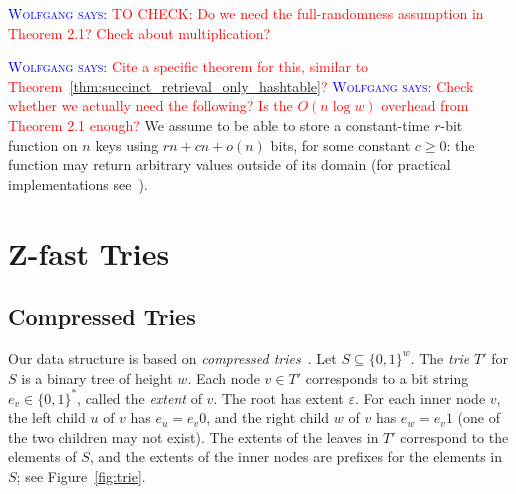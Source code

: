 \documentclass[a4paper,11pt]{article}
\newcommand{\eps}{\varepsilon}
\newcommand{\?}{\mskip1.5mu}
\newcommand{\aremark}[3]{\textcolor{blue}{\textsc{#1 #2:}}
  \textcolor{red}{\textsf{#3}}}
\newcommand{\wolfgang}[2][says]{\aremark{Wolfgang}{#1}{#2}}
\begin{document}
\wolfgang{TO CHECK: Do we need the full-randomness assumption in 
Theorem 2.1? Check about multiplication?}

\wolfgang{Cite a specific theorem for this, similar to 
  Theorem~\ref{thm:succinct_retrieval_only_hashtable}?}
\wolfgang{Check whether we actually need the following? Is the
$O(n \log w)$ overhead from Theorem 2.1 enough?}
We assume to be able to store a constant-time $r$-bit function on 
$n$ keys using $rn+cn +o(n)$ bits, for some constant $c\geq 0$: the 
function may return arbitrary values outside of its domain (for 
practical implementations see~\cite{BelazzouguiBoPaVi11}).

\section{Z-fast Tries} 

\subsection{Compressed Tries}
Our data structure is based on \emph{compressed
tries}~\cite{CormenLeRiSt09,Knuth98}. 
Let $S \subseteq \{0, 1\}^w$. The \emph{trie} $T'$ for $S$ 
is a binary tree of height $w$. Each node $v \in T'$ corresponds
to a bit string $e_v \in \{0,1\}^*$, called the \emph{extent} of $v$. 
The root has extent $\eps$. For each inner node $v$, the left child 
$u$ of $v$  has $e_u = e_v0$, and the right child $w$ of $v$ has 
$e_w = e_v1$ (one of the two children may not exist). The extents of
the leaves in $T'$ correspond to the elements of $S$, and the extents of the 
inner nodes are prefixes for the elements in $S$; see 
Figure~\ref{fig:trie}.
\end{document}
